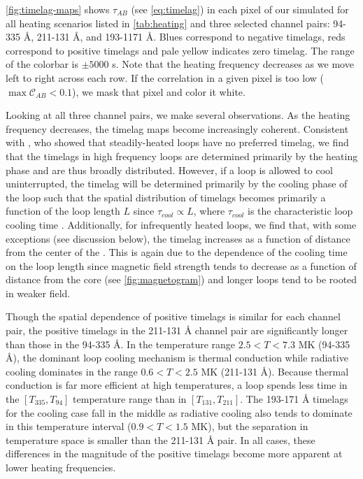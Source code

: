 \autoref{fig:timelag-maps} shows $\tau_{AB}$ (see \autoref{eq:timelag}) in each pixel of our simulated \AR{} for all heating scenarios listed in \autoref{tab:heating} and three selected channel pairs: 94-335 \AA{}, 211-131 \AA{}, and 193-1171 \AA{}. Blues correspond to negative timelags, reds correspond to positive timelags and pale yellow indicates zero timelag. The range of the colorbar is $\pm5000$ s. Note that the heating frequency decreases as we move left to right across each row. If the correlation in a given pixel is too low ($\max{\mathcal{C}_{AB}}<0.1$), we mask that pixel and color it white.

Looking at all three channel pairs, we make several observations. As the heating frequency decreases, the timelag maps become increasingly coherent. Consistent with \citet{viall_signatures_2016}, who showed that steadily-heated loops have no preferred timelag, we find that the timelags in high frequency loops are determined primarily by the heating phase and are thus broadly distributed. However, if a loop is allowed to cool uninterrupted, the timelag will be determined primarily by the cooling phase of the loop such that the spatial distribution of timelags becomes primarily a function of the loop length $L$ since $\tau_{cool}\propto L$, where $\tau_{cool}$ is the characteristic loop cooling time \citep[see Appendix of][]{cargill_active_2014}. Additionally, for infrequently heated loops, we find that, with some exceptions (see discussion below), the timelag increases as a function of distance from the center of the \AR{}. This is again due to the dependence of the cooling time on the loop length since magnetic field strength tends to decrease as a function of distance from the core (see \autoref{fig:magnetogram}) and longer loops tend to be rooted in weaker field.

Though the spatial dependence of positive timelags is similar for each channel pair, the positive timelags in the 211-131 \AA{} channel pair are significantly longer than those in the 94-335 \AA{}. In the temperature range $2.5<T<7.3$ MK (94-335 \AA{}), the dominant loop cooling mechanism is thermal conduction while radiative cooling dominates in the range $0.6<T<2.5$ MK (211-131 \AA{}). Because thermal conduction is far more efficient at high temperatures, a loop spends less time in the $[T_{335},T_{94}]$ temperature range than in $[T_{131},T_{211}]$. The 193-171 \AA{} timelags for the cooling case fall in the middle as radiative cooling also tends to dominate in this temperature interval ($0.9<T<1.5$ MK), but the separation in temperature space is smaller than the 211-131 \AA{} pair. In all cases, these differences in the magnitude of the positive timelags become more apparent at lower heating frequencies.

